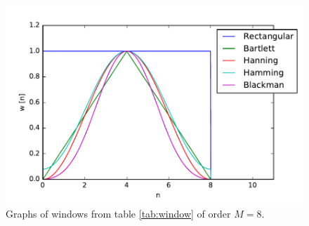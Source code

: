 \begin{figure}[H]
    \centering
    \includegraphics[scale=0.8]{figures/filter_teori/window_types.pdf}
    \caption{Graphs of windows from table \ref{tab:window} of order $M = 8$.}
    \label{fig:window_types}
\end{figure}  

